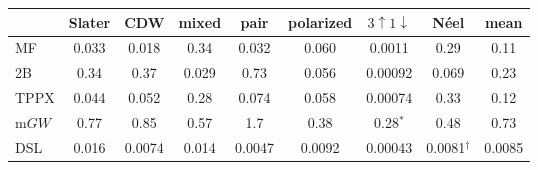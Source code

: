 \begin{tabular}{lcccccccc}
 & Slater & CDW & mixed & pair & polarized & $3\!\uparrow\!1\!\downarrow$ & N\'eel & mean \\
\hline
MF    & 0.033 & 0.018 & 0.34 & 0.032 & 0.060 & 0.0011 & 0.29 & 0.11 \\
2B    & 0.34 & 0.37 & 0.029 & 0.73 & 0.056 & 0.00092 & 0.069 & 0.23 \\
TPPX  & 0.044 & 0.052 & 0.28 & 0.074 & 0.058 & 0.00074 & 0.33 & 0.12 \\
m$GW$ & 0.77 & 0.85 & 0.57 & 1.7 & 0.38 & 0.28$^*$ & 0.48 & 0.73 \\
DSL   & 0.016 & 0.0074 & 0.014 & 0.0047 & 0.0092 & 0.00043 & 0.0081$^\dagger$ & 0.0085 \\
\end{tabular}
